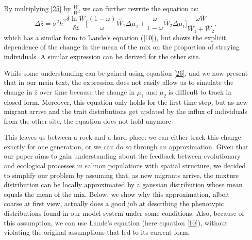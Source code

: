 \documentclass[a4paper]{article}
\begin{document}
By multiplying \ref{25} by $\frac{\overline{W}}{\overline{W}}$, we can further rewrite the equation as:
\begin{equation}\label{26}
\Delta\overline{z}=\sigma^{2}h^{2}\frac{\delta \ln \overline{W}}{\delta \overline{z}}\Big[\frac{(1-\omega)}{\omega}\overline{W}_{1}\Delta\mu_{2}+\frac{\omega}{1-\omega}\overline{W}_{2}\Delta\mu_{1} \Big]\frac{\omega \overline{W}}{\overline{W}_{1}+\overline{W}_{2}},
\end{equation}
which has a similar form to Lande's equation (\ref{10}), but shows the explicit dependence of the change in the mean of the mix on the proportion of straying individuals. A similar expression can be derived for the other site. 

While some understanding can be gained using equation \ref{26}, and we now present that in our main text, the expression does not easily allow us to simulate the change in $\overline{z}$ over time because the change in $\mu_{1}$ and $\mu_{2}$ is difficult to track in closed form. Moreover, this equation only holds for the first time step, but as new migrant arrive and the trait distributions get updated by the influx of individuals from the other site, the equation does not hold anymore. 

This leaves us between a rock and a hard place: we can either track this change exactly for one generation, or we can do so through an approximation. Given that our paper aims to gain understanding about the feedback between evolutionary and ecological processes in salmon populations with spatial structure, we decided to simplify our problem by assuming that, as new migrants arrive, the mixture distribution can be locally approximated by a gaussian distribution whose mean equals the mean of the mix. Below, we show why this approximation, albeit coarse at first view, actually does a good job at describing the phenotypic distributions found in our model system under some conditions. Also, because of this assumption, we can use Lande's equation (here equation \ref{10}), without violating the original assumptions that led to its current form.




\end{document}
